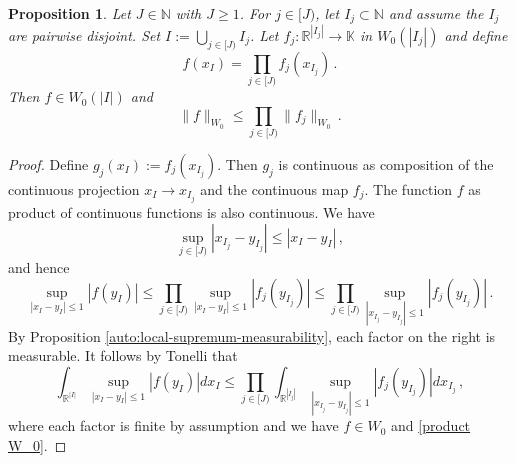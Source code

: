 \documentclass[12pt,reqno]{amsart}
\theoremstyle{plain}
\newtheorem{proposition}[theorem]{Proposition}
\numberwithin{equation}{section}
\theoremstyle{remark}
\newcommand{\uses}[1]{}
\newcommand{\usesdefs}[1]{}
\newcommand{\R}{{\mathbb R}}
\newcommand{\N}{{\mathbb N}}
\begin{document}
\begin{proposition}\label{tensor Wiener}\uses{auto:local-supremum-measurability}\usesdefs{auto:Wiener-space-definition}
    Let $J\in \N$ with $J\ge 1$. For $j\in [J)$, let $I_j\subset \N$ and assume the $I_j$ are pairwise disjoint.
    Set $I:=\bigcup_{j\in [J)}I_j$. Let $f_j:\R^{|I_j|}\to \mathbb{K}$ in $W_0(|I_j|)$ and define
    \begin{equation}\label{auto:Wiener-product-function}
        f(x_I)=\prod_{j\in [J)}f_j(x_{I_j})\, .
    \end{equation}
    Then $f\in W_0(|I|)$ and
    \begin{equation}\label{product W_0}
        \|f\|_{W_0}\le \prod_{j\in [J)}\|f_j\|_{W_0}\, .
    \end{equation}
\end{proposition}
\begin{proof}
    Define $g_j(x_I):=f_j(x_{I_j})$. Then $g_j$ is continuous as composition of the continuous
    projection $x_I\to x_{I_j}$ and the continuous map $f_j$. The function $f$ as product of
    continuous functions is also continuous.
We have
\begin{equation}
     \sup_{j\in [J)} |x_{I_j}-y_{I_j}|\le |x_I-y_I|\, ,
\end{equation}
and hence
\begin{equation}
    \sup_{|x_I-y_I|\le 1}|f(y_I)|\le \prod_{j\in [J)} \sup_{|x_{I}-y_{I}|\le 1}|f_j(y_{I_j})|\le
    \prod_{j\in [J)} \sup_{|x_{I_j}-y_{I_j}|\le 1}|f_j(y_{I_j})|\, .
\end{equation}
By Proposition \ref{auto:local-supremum-measurability}, each factor on the right is measurable. It follows by Tonelli that
\begin{equation}
    \int_{\R^{|I|}}\sup_{|x_I-y_I|\le 1}|f(y_I)|dx_I\le
    \prod_{j\in [J)} \int_{\R^{|I_j|}}\sup_{|x_{I_j}-y_{I_j}|\le 1}|f_j(y_{I_j})|dx_{I_j}\, ,
\end{equation}
    where each factor is finite by assumption and we have $f\in W_0$ and \eqref{product W_0}.
\end{proof}
\end{document}
